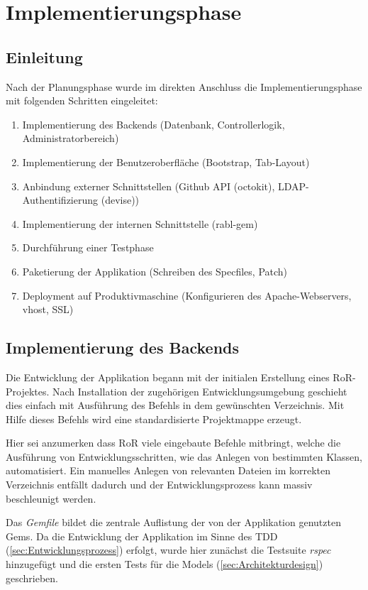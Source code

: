 \section{Implementierungsphase}
\label{sec:Implementierungsphase}

\subsection{Einleitung}
\label{sec:Einleitung}
Nach der Planungsphase wurde im direkten Anschluss die Implementierungsphase mit folgenden Schritten
eingeleitet:
\begin{enumerate}
	\item Implementierung des Backends (Datenbank, Controllerlogik, Administratorbereich)
	\item Implementierung der Benutzeroberfläche (Bootstrap, Tab-Layout)
	\item Anbindung externer Schnittstellen (Github API (octokit), LDAP-Authentifizierung (devise))
	\item Implementierung der internen Schnittstelle (rabl-gem)
	\item Durchführung einer Testphase
	\item Paketierung der Applikation (Schreiben des Specfiles, Patch)
	\item Deployment auf Produktivmaschine (Konfigurieren des Apache-Webservers, vhost, SSL)
\end{enumerate}

\subsection{Implementierung des Backends}
\label{sec:Implementierung des Backends}
Die Entwicklung der Applikation begann mit der initialen Erstellung eines \acs{RoR}-Projektes.
Nach Installation der zugehörigen Entwicklungsumgebung geschieht dies einfach mit Ausführung des
Befehls  in dem gewünschten Verzeichnis. Mit Hilfe dieses Befehls wird eine
standardisierte Projektmappe erzeugt.

Hier sei anzumerken dass RoR viele eingebaute Befehle mitbringt, welche die Ausführung von
Entwicklungsschritten, wie \bspw das Anlegen von bestimmten Klassen, automatisiert. Ein manuelles
Anlegen von relevanten Dateien im korrekten Verzeichnis entfällt dadurch und der Entwicklungsprozess
kann massiv beschleunigt werden.

Das \textit{Gemfile} bildet die zentrale Auflistung der von der Applikation genutzten Gems. Da die
Entwicklung der Applikation im Sinne des \acs{TDD} (\Vgl \ref{sec:Entwicklungsprozess}) erfolgt,
wurde hier zunächst die Testsuite \textit{rspec} hinzugefügt und die ersten Tests für die Models
(\Vgl \ref{sec:Architekturdesign}) geschrieben.

